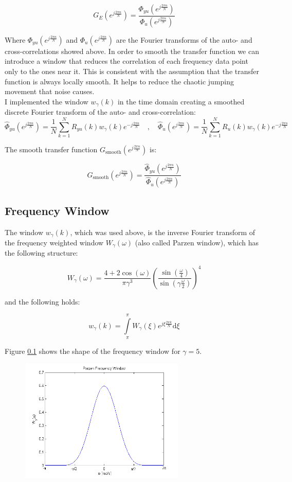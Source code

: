 \[G_E(e^{j\frac{2\pi n}{N}}) = \frac{\Phi_{yu}(e^{j\frac{2\pi n}{N}})}{\Phi_{u}(e^{j\frac{2\pi n}{N}})}\]

Where $\Phi_{yu}(e^{j\frac{2\pi n}{N}})$ and $\Phi_{u}(e^{j\frac{2\pi n}{N}})$ are the Fourier transforms of the auto- and cross-correlations showed above. In order to smooth the transfer function we can introduce a window that reduces the correlation of each frequency data point only to the ones near it. This is consistent with the assumption that the transfer function is always locally smooth. It helps to reduce the chaotic jumping movement that noise causes. \\

I implemented the window $w_\gamma(k)$ in the time domain creating a smoothed discrete Fourier transform of the auto- and cross-correlation:
\[\hat{\Phi}_{yu}(e^{j\frac{2\pi n}{N}}) = \frac{1}{N}\sum\limits_{k = 1}^{N }R_{yu}(k)w_\gamma(k)e^{-j\frac{2\pi n}{N}} \quad, \quad \hat{\Phi}_{u}(e^{j\frac{2\pi n}{N}}) = \frac{1}{N}\sum\limits_{k = 1}^{N }R_{u}(k)w_\gamma(k)e^{-j\frac{2\pi n}{N}}\]

The smooth transfer function $G_\text{smooth}(e^{j\frac{2\pi n}{N}})$ is:


\[G_\text{smooth}(e^{j\frac{2\pi n}{N}}) = \frac{\hat{\Phi}_{yu}(e^{j\frac{2\pi n}{N}})}{\hat{\Phi}_{u}(e^{j\frac{2\pi n}{N}})}\]


\subsection{Frequency Window}

The window $w_\gamma(k)$, which was used above, is the inverse Fourier transform of the frequency weighted window $W_\gamma(\omega)$ (also called Parzen window), which has the following structure:

\[W_\gamma(\omega) = \frac{4+2\cos(\omega)}{\pi \gamma^3}\left( \frac{\sin(\frac{\omega}{4})}{\sin(\gamma\frac{\omega}{2})}\right)^4 \]

and the following holds:

\[w_\gamma(k) = \int\limits_\pi^\pi W_\gamma(\xi)e^{j\xi \frac{2\pi k}{N}}\text{d}\xi\]

Figure \ref{} shows the shape of the frequency window for $\gamma = 5$.


\begin{figure}[h]
\centering
\includegraphics[width=0.7\textwidth]{pics/parzen}
\caption{}
\label{pic:}
\end{figure}



